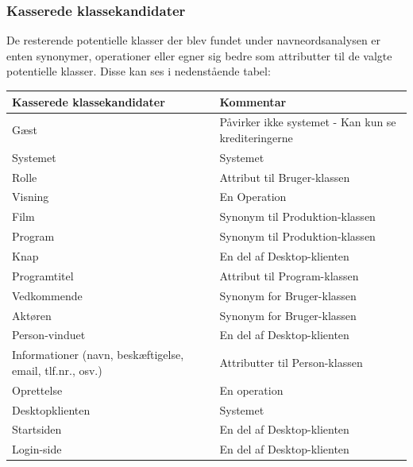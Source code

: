 \noindent
{}

\subsubsection{Kasserede klassekandidater}
De resterende potentielle klasser der blev fundet under navneordsanalysen er enten synonymer, operationer  eller egner sig bedre som attributter til de valgte potentielle klasser. Disse kan ses i nedenstående tabel: 

\begin{table}[H]
    \begin{tabularx}{\textwidth}{|X|X|}
        \hline
        \textbf{Kasserede klassekandidater} & \textbf{Kommentar} \\
        \hline
        Gæst & Påvirker ikke systemet - Kan kun se krediteringerne\\
        \hline
        Systemet & Systemet  \\
        \hline
        Rolle   & Attribut til Bruger-klassen\\
        \hline
        Visning  & En Operation\\
        \hline
        Film & Synonym til Produktion-klassen\\ 
        \hline
        Program & Synonym til Produktion-klassen\\ 
        \hline
        Knap & En del af Desktop-klienten\\
        \hline
        Programtitel & Attribut til Program-klassen\\
        \hline
        Vedkommende & Synonym for Bruger-klassen\\
        \hline
        Aktøren &  Synonym for Bruger-klassen\\
        \hline
        Person-vinduet & En del af Desktop-klienten\\
        \hline
        Informationer (navn, beskæftigelse, email, tlf.nr., osv.) &  Attributter til Person-klassen\\
        \hline
        Oprettelse & En operation \\
        \hline
        Desktopklienten &  Systemet\\
        \hline
        Startsiden &  En del af Desktop-klienten\\
        \hline
        Login-side & En del af Desktop-klienten\\
        \hline

\end{tabularx}
\end{table}
